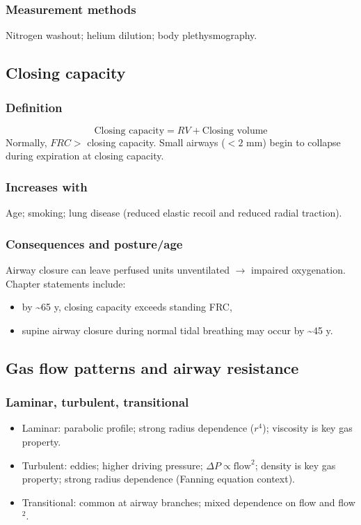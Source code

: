 \documentclass[11pt,a4paper]{article}
\begin{document}
\subsubsection{Measurement methods}
Nitrogen washout; helium dilution; body plethysmography.

\subsection{Closing capacity}
\subsubsection{Definition}
\[
\text{Closing capacity} = RV + \text{Closing volume}
\]
Normally, $FRC >$ closing capacity. Small airways ($<2$ mm) begin to collapse during expiration at closing capacity.

\subsubsection{Increases with}
Age; smoking; lung disease (reduced elastic recoil and reduced radial traction).

\subsubsection{Consequences and posture/age}
Airway closure can leave perfused units unventilated $\rightarrow$ impaired oxygenation. Chapter statements include:
\begin{itemize}
  \item by \textasciitilde 65 y, closing capacity exceeds standing FRC,
  \item supine airway closure during normal tidal breathing may occur by \textasciitilde 45 y.
\end{itemize}

\subsection{Gas flow patterns and airway resistance}
\subsubsection{Laminar, turbulent, transitional}
\begin{itemize}
  \item Laminar: parabolic profile; strong radius dependence ($r^4$); viscosity is key gas property.
  \item Turbulent: eddies; higher driving pressure; $\Delta P \propto \text{flow}^2$; density is key gas property; strong radius dependence (Fanning equation context).
  \item Transitional: common at airway branches; mixed dependence on flow and flow$^2$.
\end{itemize}
\end{document}
